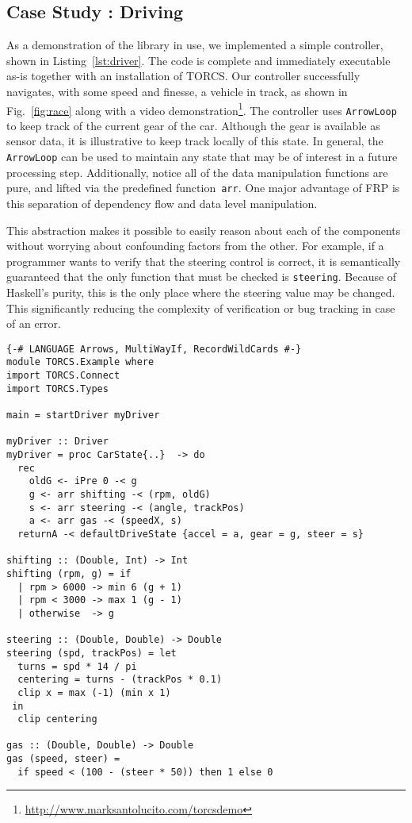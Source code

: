 \subsection{Case Study : Driving}

As a demonstration of the \ourLib library in use, we implemented a simple controller, shown in Listing~\ref{lst:driver}. 
The code is complete and immediately executable as-is together with an installation of TORCS.
Our controller successfully navigates, with some speed and finesse, a vehicle in track, as shown in Fig.~\ref{fig:race} along with a video demonstration\footnote{\url{http://www.marksantolucito.com/torcsdemo}}.
The controller uses \texttt{ArrowLoop} to keep track of the current gear of the car.
Although the gear is available as sensor data, it is illustrative to keep track locally of this state.
In general, the \texttt{ArrowLoop} can be used to maintain any state that may be of interest in a future processing step.
Additionally, notice all of the data manipulation functions are pure, and lifted via the predefined function~\texttt{arr}.
One major advantage of FRP is this separation of dependency flow and data level manipulation. 

This abstraction makes it possible to easily reason about each of the components without worrying about confounding factors from the other.
For example, if a programmer wants to verify that the steering control is correct, it is semantically guaranteed that the only function that must be checked is \texttt{steering}.
Because of Haskell's purity, this is the only place where the steering value may be changed. This significantly reducing the complexity of verification or bug tracking in case of an error.

\begin{lstlisting}[float,floatplacement=TR,caption=A complete basic controller in Yampa, label=lst:driver]
{-# LANGUAGE Arrows, MultiWayIf, RecordWildCards #-}
module TORCS.Example where
import TORCS.Connect
import TORCS.Types

main = startDriver myDriver

myDriver :: Driver
myDriver = proc CarState{..}  -> do
  rec 
    oldG <- iPre 0 -< g
    g <- arr shifting -< (rpm, oldG)
    s <- arr steering -< (angle, trackPos)
    a <- arr gas -< (speedX, s)
  returnA -< defaultDriveState {accel = a, gear = g, steer = s}

shifting :: (Double, Int) -> Int
shifting (rpm, g) = if 
  | rpm > 6000 -> min 6 (g + 1)
  | rpm < 3000 -> max 1 (g - 1)
  | otherwise  -> g
 
steering :: (Double, Double) -> Double
steering (spd, trackPos) = let
  turns = spd * 14 / pi
  centering = turns - (trackPos * 0.1)
  clip x = max (-1) (min x 1)
 in
  clip centering

gas :: (Double, Double) -> Double
gas (speed, steer) = 
  if speed < (100 - (steer * 50)) then 1 else 0
\end{lstlisting}


